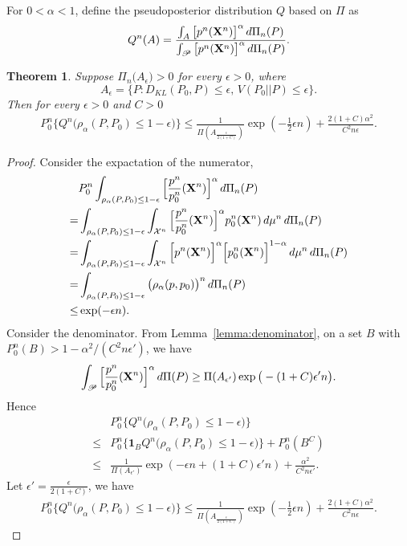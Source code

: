 \documentclass[11pt, letterpaper]{article}
\theoremstyle{plain}
\newtheorem{theorem}{\quad\quad Theorem}
\theoremstyle{definition}
\theoremstyle{remark}
\begin{document}
For $0<\alpha<1$, define the pseudoposterior distribution $Q$ based on $\Pi$ as
$$
Q^n (A)=\frac{\int_{A} \big[p^n(\mathbf{X}^n)\big]^{\alpha}\, d\Pi_n(P)}{\int_{\mathscr{P}} \big[p^n(\mathbf{X}^n)\big]^{\alpha}\, d\Pi_n(P)}.
$$
\begin{theorem}
    Suppose $\Pi_n\Big(A_{\epsilon}\Big)>0$ for every $\epsilon>0$, where
    $$
    A_{\epsilon}=\{P: D_{KL}(P_0,P)\leq \epsilon, \, V(P_0 || P) \leq \epsilon\}.
    $$
    Then for every $\epsilon>0$ and $C>0$
     $$
     \begin{aligned}
         P_0^n \Big\{ Q^n\big( \rho_\alpha (P,P_0)\leq 1-\epsilon\big)\Big\}
         \leq \frac{1}{\Pi(A_{\frac{\epsilon}{2(1+C)}})}\exp (-\frac{1}{2}\epsilon n) +\frac{2(1+C)\alpha^2}{C^2n\epsilon}.
     \end{aligned}
     $$
\end{theorem}
\begin{proof}
Consider the expactation of the numerator,
    $$
    \begin{aligned}
        &P_0^n\int_{\rho_{\alpha}(P,P_0)\leq 1- \epsilon} \Big[ \frac{p^n}{p_0^n} (\mathbf{X}^n) \Big]^{\alpha} \, d \Pi_n(P)
        \\
        =&
        \int_{\rho_{\alpha}(P,P_0)\leq 1- \epsilon} \int_{\mathcal{X}^n}\Big[ \frac{p^n}{p_0^n} (\mathbf{X}^n) \Big]^{\alpha} p_0^n (\mathbf{X}^n)\, d\mu^n \, d \Pi_n(P)\\
        =&
        \int_{\rho_{\alpha}(P,P_0)\leq 1- \epsilon} \int_{\mathcal{X}^n}\Big[ {p^n} (\mathbf{X}^n) \Big]^{\alpha}  \Big[ p_0^n (\mathbf{X}^n) \Big]^{1-\alpha} \, d\mu^n \, d \Pi_n(P)\\
        =&
        \int_{\rho_{\alpha}(P,P_0)\leq 1- \epsilon} \big( \rho_{\alpha}(p,p_0) \big)^n \, d \Pi_n(P)\\
        \leq&
        \exp (-\epsilon n).
    \end{aligned}
    $$
    Consider the denominator.
     From Lemma~\ref{lemma:denominator}, on a set $B$ with $P_0^n(B)>1-\alpha^2/(C^2 n \epsilon')$, we have
     $$
     \int_{\mathscr{P}}\Big[\frac{p^n}{p_0^n}(\mathbf{X}^n)\Big]^{\alpha} \, d\Pi(P)
     \geq \Pi(A_{\epsilon'}) \exp \big(-(1+C)\epsilon' n\big).
     $$
     Hence 
     $$
     \begin{aligned}
         &P_0^n \Big\{ Q^n\big( \rho_\alpha (P,P_0)\leq 1-\epsilon\big)\Big\}\\
         \leq&P_0^n \Big\{ \mathbf{1}_{B} Q^n\big( \rho_\alpha (P,P_0)\leq 1-\epsilon\big)\Big\}+P_0^n (B^C)\\
         \leq& \frac{1}{\Pi(A_{\epsilon'})}\exp (-\epsilon n+(1+C)\epsilon' n) +\frac{\alpha^2}{C^2n\epsilon'}.
     \end{aligned}
     $$
     Let $\epsilon'=\frac{\epsilon}{2(1+C)}$, we have
     $$
     \begin{aligned}
         P_0^n \Big\{ Q^n\big( \rho_\alpha (P,P_0)\leq 1-\epsilon\big)\Big\}
         \leq \frac{1}{\Pi(A_{\frac{\epsilon}{2(1+C)}})}\exp (-\frac{1}{2}\epsilon n) +\frac{2(1+C)\alpha^2}{C^2n\epsilon}.
     \end{aligned}
     $$
\end{proof}
\end{document}
